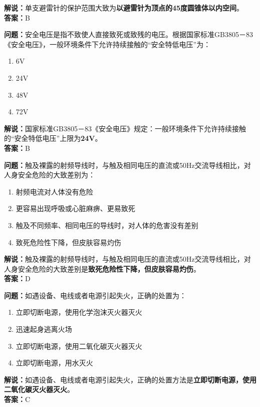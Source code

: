 \documentclass{ctexbook}
\begin{document}
\noindent\textbf{解说：}单支避雷针的保护范围大致为\textbf{以避雷针为顶点的45度圆锥体以内空间}。\\\noindent\textbf{答案：}B%


\bigskip


\noindent\textbf{问题：}安全电压是指不致使人直接致死或致残的电压。根据国家标准GB3805－83《安全电压》，一般环境条件下允许持续接触的“安全特低电压”为：

\begin{enumerate}[label=\Alph*), leftmargin=3em]
	\item 6V
	\item 24V
	\item 48V
	\item 72V
\end{enumerate}

\noindent\textbf{解说：}国家标准GB3805－83《安全电压》规定：一般环境条件下允许持续接触的“安全特低电压”上限为\textbf{24V}。\\\noindent\textbf{答案：}B%


\bigskip


\noindent\textbf{问题：}触及裸露的射频导线时，与触及相同电压的直流或50Hz交流导线相比，对人身安全危险的大致差别为：
\begin{enumerate}[label=\Alph*), leftmargin=3em]
	\item 射频电流对人体没有危险
	\item 更容易出现呼吸或心脏麻痹、更易致死
	\item 触及不同频率、相同电压的导线时，对人体的危害没有差别
	\item 致死危险性下降，但皮肤容易灼伤
\end{enumerate}
\noindent\textbf{解说：}触及裸露的射频导线时，与触及相同电压的直流或50Hz交流导线相比，对人身安全危险的大致差别是\textbf{致死危险性下降，但皮肤容易灼伤}。\\\noindent\textbf{答案：}D

\bigskip


\noindent\textbf{问题：}如遇设备、电线或者电源引起失火，正确的处置为：
\begin{enumerate}[label=\Alph*), leftmargin=3em]
	\item 立即切断电源，使用化学泡沫灭火器灭火
	\item 迅速起身逃离火场
	\item 立即切断电源，使用二氧化碳灭火器灭火
	\item 立即切断电源，用水灭火
\end{enumerate}
\noindent\textbf{解说：}如遇设备、电线或者电源引起失火，正确的处置方法是\textbf{立即切断电源，使用二氧化碳灭火器灭火}。\\\noindent\textbf{答案：}C
\end{document}

